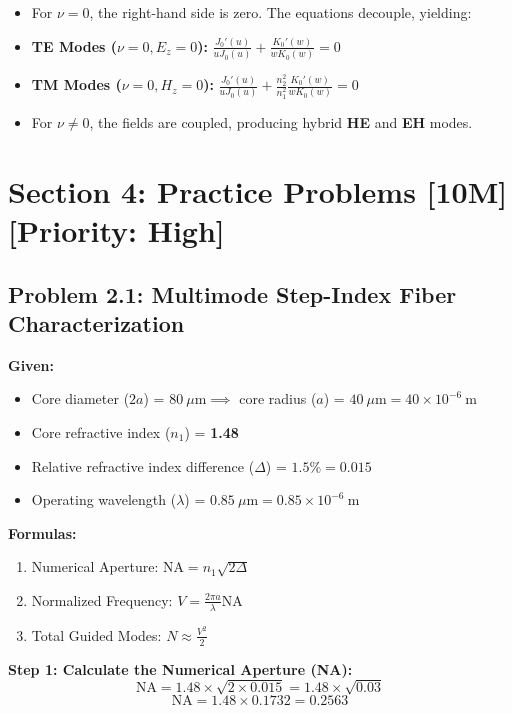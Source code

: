 \begin{itemize}
  \item   For $\nu = 0$, the right-hand side is zero. The equations decouple, yielding:
  \item   \textbf{TE Modes ($\nu=0, E_z=0$):} $\frac{J_0'(u)}{u J_0(u)} + \frac{K_0'(w)}{w K_0(w)} = 0$
  \item   \textbf{TM Modes ($\nu=0, H_z=0$):} $\frac{J_0'(u)}{u J_0(u)} + \frac{n_2^2}{n_1^2} \frac{K_0'(w)}{w K_0(w)} = 0$
  \item   For $\nu \neq 0$, the fields are coupled, producing hybrid \textbf{HE} and \textbf{EH} modes.
\end{itemize}


\section{Section 4: Practice Problems [10M] [Priority: High]}

\subsection{Problem 2.1: Multimode Step-Index Fiber Characterization}
\textbf{Given:}
\begin{itemize}
  \item   Core diameter ($2a$) = $80\ \mu\text{m} \implies$ core radius ($a$) = $40\ \mu\text{m} = 40 \times 10^{-6}\ \text{m}$
  \item   Core refractive index ($n_1$) = \textbf{1.48}
  \item   Relative refractive index difference ($\Delta$) = $1.5\% = 0.015$
  \item   Operating wavelength ($\lambda$) = $0.85\ \mu\text{m} = 0.85 \times 10^{-6}\ \text{m}$
\end{itemize}

\textbf{Formulas:}
\begin{enumerate}
  \item Numerical Aperture: $\text{NA} = n_1\sqrt{2\Delta}$
  \item Normalized Frequency: $V = \frac{2\pi a}{\lambda}\text{NA}$
  \item Total Guided Modes: $N \approx \frac{V^2}{2}$
\end{enumerate}

\textbf{Step 1: Calculate the Numerical Aperture (NA):}
\[ \text{NA} = 1.48 \times \sqrt{2 \times 0.015} = 1.48 \times \sqrt{0.03} \]
\[ \text{NA} = 1.48 \times 0.1732 = 0.2563 \]

